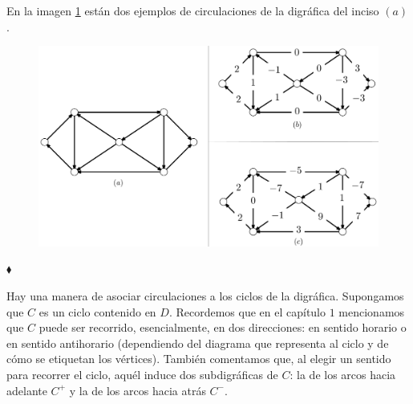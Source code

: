 \begin{ejem}
En la imagen \ref{fig:circulacion} están dos ejemplos de circulaciones de la digráfica del inciso $(a)$.

\begin{figure}[H]
    \centering
    \includegraphics[scale=0.2]{img/imgchapter2/circulacion.jpg}
    \caption{}
    \label{fig:circulacion}
\end{figure}
\hfill $\blacklozenge$
\end{ejem}


Hay una manera de asociar circulaciones a los ciclos de la digráfica. Supongamos que $C$ es un ciclo contenido en $D$. Recordemos que en el capítulo $1$ mencionamos que $C$ puede ser recorrido, esencialmente, en dos direcciones: en sentido horario o en sentido antihorario (dependiendo del diagrama que representa al ciclo y de cómo se etiquetan los vértices). También comentamos que, al elegir un sentido para recorrer el ciclo, aquél induce dos subdigráficas de $C$:  la de los arcos hacia adelante $C^{+}$ y la de los arcos hacia atrás $C^{-}$.

